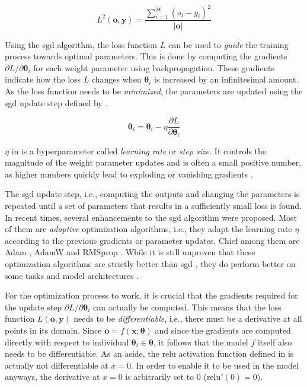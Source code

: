 \begin{equation}
    \label{eq:mse}
    L^2(\textbf{o}, \textbf{y}) = \frac{\sum_{i=1}^{|\textbf{o}|} (o_i - y_i)^2}{|\mathbf{o}|}
\end{equation}

Using the \gls{sgd} algorithm, the loss function $L$ can be used to \emph{guide} the training process towards optimal parameters. This is done by computing the gradients $\partial L / \partial \boldsymbol{\theta}_i$ for each weight parameter using backpropagation. These gradients indicate how the loss $L$ changes when $\boldsymbol{\theta}_i$ is increased by an infinitesimal amount. As the loss function needs to be \emph{minimized}, the parameters are updated using the \gls{sgd} update step defined by .

\begin{equation}
\label{eq:sgd}
        \boldsymbol{\theta}_i = \boldsymbol{\theta}_i - \eta \frac {\partial L} {\partial \boldsymbol{\theta}_i}
\end{equation}

$\eta$ in  is a hyperparameter called \emph{learning rate} or \emph{step size}. It controls the magnitude of the weight parameter updates and is often a small positive number, as higher numbers quickly lead to exploding or vanishing gradients \citep{hochreiterdipl}.

The \gls{sgd} update step, i.e., computing the outputs and changing the parameters is repeated until a set of parameters that results in a sufficiently small loss is found. In recent times, several enhancements to the \gls{sgd} algorithm were proposed. Most of them are \emph{adaptive} optimization algorithms, i.e., they adapt the learning rate $\eta$ according to the previous gradients or parameter updates. Chief among them are Adam \citep{DBLP:journals/corr/KingmaB14}, AdamW \citep{DBLP:conf/iclr/LoshchilovH19} and RMSprop \citep{rmsprop}. While it is still unproven that these optimization algorithms are strictly better than \gls{sgd} \citep{DBLP:conf/icml/HardtRS16, NIPS2017_7003}, they do perform better on some tasks and model architectures \citep{DBLP:conf/emnlp/LiuLGCH20,DBLP:conf/nips/Anil0KS19}.

For the optimization process to work, it is crucial that the gradients required for the update step $\partial L / \partial \boldsymbol{\theta}_i$ can actually be computed. This means that the loss function $L(\textbf{o},\mathbf{y})$ needs to be \emph{differentiable}, i.e., there must be a derivative at all points in its domain. Since $\textbf{o}=f(\textbf{x}; \boldsymbol{\theta})$ and since the gradients are computed directly with respect to individual $\boldsymbol{\theta}_i\in\boldsymbol{\theta}$, it follows that the model $f$ itself also needs to be differentiable. As an aside, the \gls{relu} activation function defined in  is actually not differentiable at $x=0$. In order to enable it to be used in the model anyways, the derivative at $x=0$ is arbitrarily set to $0$ ($\text{relu}'(0)=0$).

